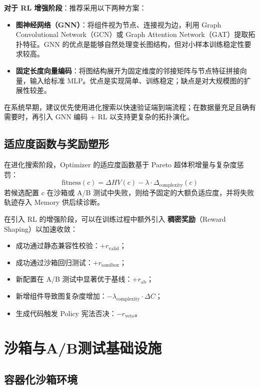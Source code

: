 \textbf{对于 RL 增强阶段}：推荐采用以下两种方案：

\begin{itemize}
    \item \textbf{图神经网络（GNN）}：将组件视为节点、连接视为边，利用 Graph Convolutional Network（GCN）或 Graph Attention Network（GAT）提取拓扑特征。GNN 的优点是能够自然处理变长图结构，但对小样本训练稳定性要求较高。
    \item \textbf{固定长度向量编码}：将图结构展开为固定维度的邻接矩阵与节点特征拼接向量，输入给标准 MLP。优点是实现简单、训练稳定；缺点是对大规模图的扩展性较差。
\end{itemize}

在系统早期，建议优先使用进化搜索以快速验证端到端流程；在数据量充足且确有需要时，再引入 GNN 编码 + RL 以支持更复杂的拓扑演化。

\subsection{适应度函数与奖励塑形}

在进化搜索阶段，Optimizer 的适应度函数基于 Pareto 超体积增量与复杂度惩罚：
$$
\text{fitness}(c) = \Delta HV(c) - \lambda \cdot \Delta_{\text{complexity}}(c)
$$
若候选配置 $c$ 在沙箱或 A/B 测试中失败，则给予固定的大额负适应度，并将失败轨迹存入 Memory 供后续诊断。

在引入 RL 的增强阶段，可以在训练过程中额外引入 \textbf{稠密奖励}（Reward Shaping）以加速收敛：
\begin{itemize}
    \item 成功通过静态兼容性校验：$+r_{\text{valid}}$；
    \item 成功通过沙箱回归测试：$+r_{\text{sandbox}}$；
    \item 新配置在 A/B 测试中显著优于基线：$+r_{\text{ab}}$；
    \item 新增组件导致图复杂度增加：$-\lambda_{\text{complexity}} \cdot \Delta C$；
    \item 生成代码触发 Policy 宪法否决：$-r_{\text{veto}}$。
\end{itemize}

\section{沙箱与A/B测试基础设施}

\subsection{容器化沙箱环境}

